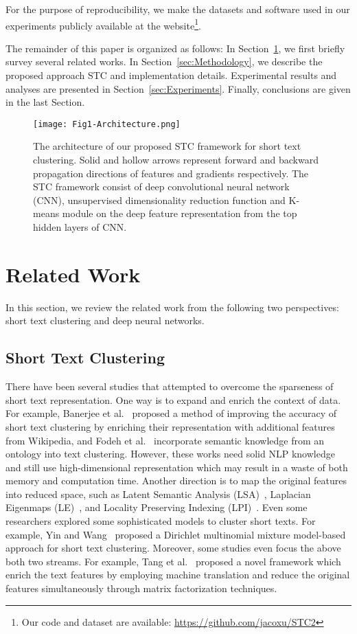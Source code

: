 \documentclass[review]{elsarticle}
\begin{document}
For the purpose of reproducibility, we make the datasets and software used in our experiments publicly available at the website\footnote{Our code and dataset are available: \url{https://github.com/jacoxu/STC2}}.

The remainder of this paper is organized as follows: In Section~\ref{sec:RelatedWork}, we first briefly survey several related works. In Section~\ref{sec:Methodology}, we describe the proposed approach STC and implementation details. Experimental results and analyses are presented in Section~\ref{sec:Experiments}. Finally, conclusions are given in the last Section.

\begin{figure}[t]
\begin{center}
\texttt{[image: Fig1-Architecture.png]}
\caption{The architecture of our proposed STC framework for short text clustering. Solid and hollow arrows represent forward and backward propagation directions of features and gradients respectively. The STC framework consist of deep convolutional neural network (CNN), unsupervised dimensionality reduction function and K-means module on the deep feature representation from the top hidden layers of CNN.}\label{fig:Architecture}
\end{center}
\end{figure}

\section{Related Work}
\label{sec:RelatedWork}
In this section, we review the related work from the following two perspectives: short text clustering and deep neural networks.
\subsection{Short Text Clustering}
There have been several studies that attempted to overcome the sparseness of short text representation. One way is to expand and enrich the context of data. For example, Banerjee et al.~\cite{29_banerjee2007clustering} proposed a method of improving the accuracy of short text clustering by enriching their representation with additional features from Wikipedia, and Fodeh et al.~\cite{33_fodeh2011ontology} incorporate semantic knowledge from an ontology into text clustering. However, these works need solid NLP knowledge and still use high-dimensional representation which may result in a waste of both memory and
computation time. Another direction is to map the original features into reduced space, such as Latent Semantic Analysis (LSA)~\cite{deerwester1990indexing}, Laplacian Eigenmaps (LE)~\cite{37_ng2002spectral}, and Locality Preserving Indexing (LPI)~\cite{niyogi2004locality}. Even some researchers explored some sophisticated models to cluster short texts. For example, Yin and Wang~\cite{30_yin2014dirichlet} proposed a Dirichlet multinomial mixture model-based approach for short text clustering. Moreover, some studies even focus the above both two streams. For example, Tang et al.~\cite{32_tang2012enriching} proposed a novel framework which enrich the text features by employing machine translation and reduce the original features simultaneously through matrix factorization techniques.
\end{document}
